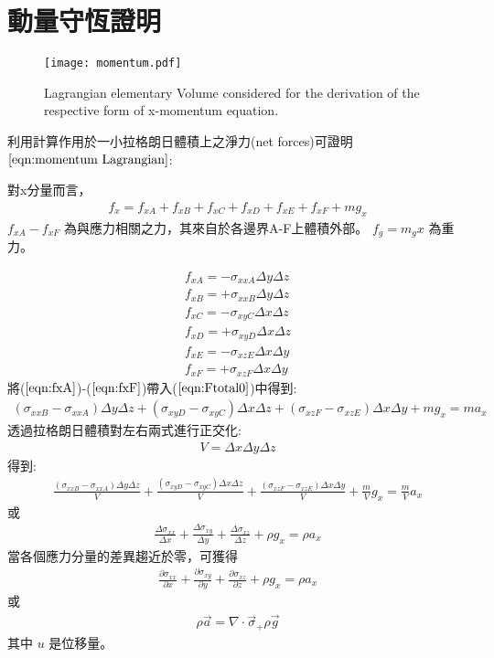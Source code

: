 
\section{動量守恆證明}
\begin{figure*}[ht!]
    \centering
    \texttt{[image: momentum.pdf]}
    \caption{ Lagrangian elementary Volume considered for the derivation of the respective form of x-momentum equation.}
    \label{fig::Lagrangian Volume Momentum}
\end{figure*}
利用計算作用於一小拉格朗日體積上之淨力(net forces)可證明$\ref{eqn:momentum Lagrangian}$:

對x分量而言，
\begin{align}
f_x=f_{xA}+f_{xB}+f_{xC}+f_{xD}+f_{xE}+f_{xF}+mg_x \label{eqn:Ftotal0}
\end{align}
$f_{xA}- f_{xF}$ 為與應力相關之力，其來自於各邊界A-F上體積外部。 
$f_g=m_gx$ 為重力。

\begin{align}
f_{xA} = -\sigma_{xxA}\Delta y\Delta z\label{eqn:fxA}\\
f_{xB} = +\sigma_{xxB}\Delta y\Delta z\label{eqn:fxB}\\
f_{xC} = -\sigma_{xyC}\Delta x\Delta z\label{eqn:fxC}\\
f_{xD} = +\sigma_{xyD}\Delta x\Delta z\label{eqn:fxD}\\
f_{xE} = -\sigma_{xzE}\Delta x\Delta y\label{eqn:fxE}\\
f_{xF} = +\sigma_{xzF}\Delta x\Delta y\label{eqn:fxF}
\end{align}
將($\ref{eqn:fxA}$)-($\ref{eqn:fxF}$)帶入($\ref{eqn:Ftotal0}$)中得到:
\begin{align}
(\sigma_{xxB}-\sigma_{xxA})\Delta y\Delta z+(\sigma_{xyD}-\sigma_{xyC})\Delta x\Delta z+(\sigma_{xzF}-\sigma_{xzE})\Delta x\Delta y+mg_x = ma_x 
\end{align}
透過拉格朗日體積對左右兩式進行正交化:
\begin{align}
V=\Delta x\Delta y\Delta z
\end{align}
得到:
\begin{align}
\frac{(\sigma_{xxB}-\sigma_{xxA})\Delta y\Delta z}{V}+\frac{(\sigma_{xyD}-\sigma_{xyC})\Delta x\Delta z}{V}+\frac{(\sigma_{xzF}-\sigma_{xzE})\Delta x\Delta y}{V}+\frac{m}{V}g_x=\frac{m}{V}a_x
\end{align}
或
\begin{align}
\frac{\Delta\sigma_{xx}}{\Delta x}+\frac{\Delta\sigma_{xy}}{\Delta y}+\frac{\Delta\sigma_{xz}}{\Delta z}+\rho g_x = \rho a_x
\end{align}
當各個應力分量的差異趨近於零，可獲得
\begin{align}
\frac{\partial\sigma_{xx}}{\partial x}+\frac{\partial\sigma_{xy}}{\partial y}+\frac{\partial\sigma_{xz}}{\partial z}+\rho g_x = \rho a_x
\end{align}
或
\begin{align}
    \rho \vec a = \nabla\cdot\vec\sigma_+\rho\vec g
\end{align}
其中 $u$ 是位移量。
